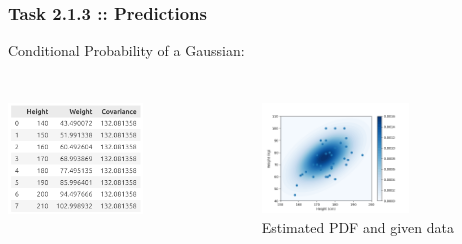 \documentclass[10pt,aspectratio=169,handout]{beamer}
\begin{document}
\begin{frame}
    \frametitle{Task 2.1.3 :: Predictions}
    Conditional Probability of a Gaussian:
    \inputminted[bgcolor=LightGray,fontsize=\small]{python}{code/predict-gaussian.py}
    
    \begin{columns}
        \begin{column}{0.5\textwidth}
        \begin{center}
            \includegraphics[width=0.7\textwidth]{images/predictions.png}
        \end{center}
        \end{column}
        \begin{column}{0.5\textwidth}  
        \begin{figure}
            \centering
            \includegraphics[width=0.7\textwidth]{images/gaussian.png}
            \caption{Estimated PDF and given data}
            \end{figure}
        \end{column}
    \end{columns}
\end{frame}
\end{document}
